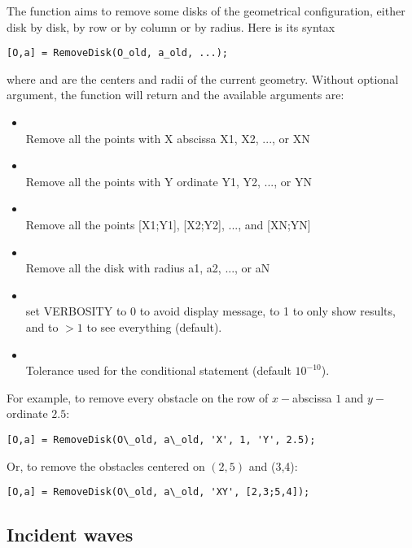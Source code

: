 The function  aims to remove some disks of the geometrical configuration, either disk by disk, by row or by column or by radius. Here is its syntax
\begin{verbatim}
[O,a] = RemoveDisk(O_old, a_old, ...);
\end{verbatim}
where  and  are the centers and radii of the current geometry. Without optional argument, the function will return  and the available arguments are:
\begin{itemize}
\item {}\\
Remove all the points with X abscissa X1, X2, ..., or XN
\item {}\\
Remove all the points with Y ordinate Y1, Y2, ..., or YN
\item {}\\
Remove all the points [X1;Y1], [X2;Y2], ..., and [XN;YN]
\item {}\\
Remove all the disk with radius a1, a2, ..., or aN
\item {}\\
set VERBOSITY to 0 to avoid display message, to 1 to only show results, and to $>1$ to see everything (default).
\item {}\\
Tolerance used for the conditional statement (default $10^{-10}$).
\end{itemize}

For example, to remove every obstacle on the row of $x-$abscissa $1$ and $y-$ordinate $2.5$:
\begin{verbatim}
[O,a] = RemoveDisk(O\_old, a\_old, 'X', 1, 'Y', 2.5);
\end{verbatim}
Or, to remove the obstacles centered on $(2,5)$ and (3,4):
\begin{verbatim}
[O,a] = RemoveDisk(O\_old, a\_old, 'XY', [2,3;5,4]);
\end{verbatim}

\subsection{Incident waves}

